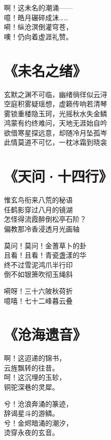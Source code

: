 啊！这未名的潮涌—— \\
噫！皓月碾碎成沫…… \\
嗬！纵沧溟倒灌穹苍， \\
噢！仍向着虚涯礼赞。

\clearpage


\section{《未名之绪》}

玄默之渊不可临，幽绪徜徉似云浔 \\
空庭积雾疑瑶想，虚籁传响若清琴 \\
雾锁重楼隐玉珂，光摇秋水失金鳞 \\
鸿蒙有约终难问，天地无涯始自吟 \\
欲借寒星探远意，却随冷月坠孤岑 \\
此情莫道不可忆，一枕冰霜到晓衾

\clearpage


\section{《天问·十四行》}

惟玄鸟衔来八荒的秘语 \\
任鹤影穿过八月的镜湖 \\
怎怪得流霞醉倒松亭石阶？ \\
偏教那冷香浸透月光画轴
\vspace{1em}

莫问！莫问！金蓍草卜的卦 \\
且看！且看！青瓷盏漾的华 \\
终不过雪泥鸿爪半行印 \\
倒不如银箫吹彻玉绳斜
\vspace{1em}

嗬呀！三十六陂秋荷折 \\
噫嘻！七十二峰暮云叠

\clearpage


\section{《沧海遗音》}

啊！这迢递的锦书， \\
云旌飘转的往昔。 \\
呵！这沉埋的玉轸， \\
铜驼深巷的灵犀。
\vspace{1em}

兮！沧浪奔涌的篆迹， \\
辞谒星斗的游鳞。 \\
兮！金烬暗涌的潮汐， \\
烫穿永夜的玄音。
\vspace{1em}

